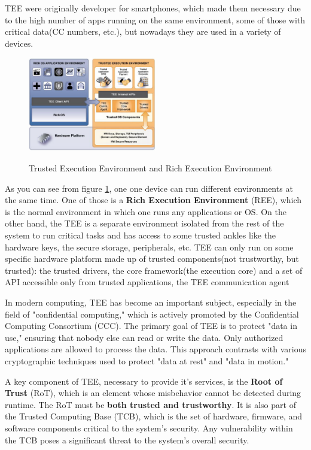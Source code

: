 TEE were originally developer for smartphones, which made them
necessary due to the high number of apps running on the same
environment, some of those with critical data(CC numbers, etc.), but
nowadays they are used in a variety of devices.

\begin{figure}[h]
  \centering
  \includegraphics[width=0.5\textwidth]{img/Tee and REE.png}
  \label{fig:tee and ree}
  \caption{Trusted Execution Environment and Rich Execution
  Environment}
\end{figure}

As you can see from figure \ref{fig:tee and ree}, one one device can
run different environments at the same time. One of those is a
\textbf{Rich Execution Environment} (REE), which is the normal
environment in which one runs any applications or OS. On the other
hand, the TEE is a separate environment isolated from the rest of the
system to run critical tasks and has access to some trusted ankles
like the hardware keys, the secure storage, peripherals, etc.
TEE can only run on some specific hardware platform made up of trusted
components(not trustworthy, but trusted): the trusted drivers, the
core framework(the execution core) and a set of API accessible only
from trusted applications, the TEE communication agent 

In modern computing, TEE has become an important subject, especially
in the field of "confidential computing," which is actively promoted
by the Confidential Computing Consortium (CCC). The primary goal of
TEE is to protect "data in use," ensuring that nobody else can read or
write the data. Only authorized applications are allowed to process
the data. This approach contrasts with various cryptographic
techniques used to protect "data at rest" and "data in motion."

A key component of TEE, necessary to provide it's services, is the
\textbf{Root of Trust} (RoT), which is an element whose misbehavior
cannot be detected during runtime. The RoT must be \textbf{both
trusted and trustworthy}. It is also part of the Trusted Computing
Base (TCB), which is the set of hardware, firmware, and software
components critical to the system's security. Any vulnerability within
the TCB poses a significant threat to the system’s overall security.

